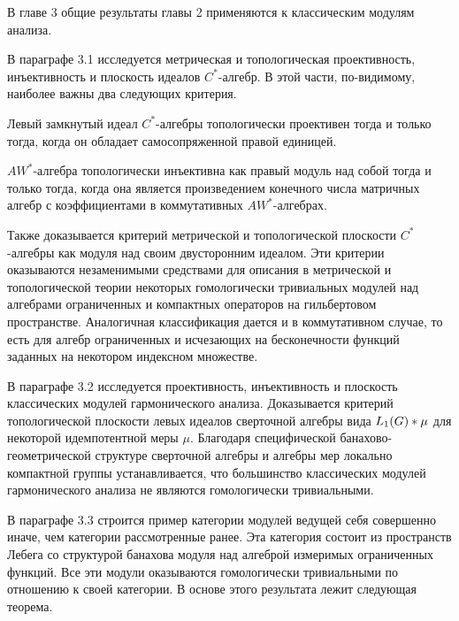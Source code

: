 В главе 3 общие результаты главы 2 применяются к классическим модулям анализа. 

В параграфе 3.1 исследуется метрическая и топологическая проективность,
инъективность и плоскость идеалов $C^*$-алгебр. В этой части, по-видимому,
наиболее важны два следующих критерия.

\begin{theorem*}[\ref{LeftIdealOfCStarAlgMetTopProjCharac}] Левый замкнутый
идеал $C^*$-алгебры топологически проективен тогда и только тогда, когда он
обладает самосопряженной правой единицей.
\end{theorem*}

\begin{theorem*}[\ref{TopInjAWStarAlgCharac}] $AW^*$-алгебра топологически
инъективна как правый модуль над собой тогда и только тогда, когда она является
произведением конечного числа матричных алгебр с коэффициентами в коммутативных
$AW^*$-алгебрах.
\end{theorem*}

Также доказывается критерий метрической и топологической плоскости $C^*$-алгебры
как модуля над своим двусторонним идеалом. Эти критерии оказываются незаменимыми
средствами для описания в метрической и топологической теории некоторых
гомологически тривиальных модулей над алгебрами ограниченных и компактных
операторов на гильбертовом пространстве. Аналогичная классификация дается и в
коммутативном случае, то есть для алгебр ограниченных и исчезающих на
бесконечности функций заданных на некотором индексном множестве. 

В параграфе 3.2 исследуется проективность, инъективность и плоскость
классических модулей гармонического анализа. Доказывается критерий
топологической плоскости левых идеалов сверточной алгебры вида
$L_1(G)\ast\mu$ для некоторой идемпотентной меры $\mu$. Благодаря
специфической банахово-геометрической структуре сверточной алгебры и алгебры мер
локально компактной группы устанавливается, что большинство классических модулей
гармонического анализа не являются гомологически тривиальными. 

В параграфе 3.3 строится пример категории модулей ведущей себя совершенно иначе,
чем категории рассмотренные ранее. Эта категория состоит из пространств Лебега
со структурой банахова модуля над алгеброй измеримых ограниченных функций. Все
эти модули оказываются гомологически тривиальными по отношению к своей
категории. В основе этого результата лежит следующая теорема.

